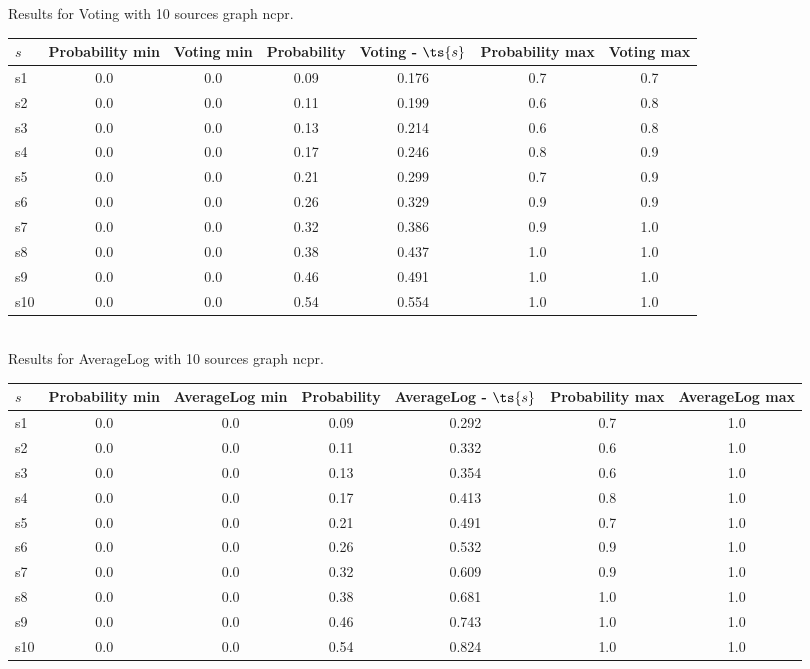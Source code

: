 \documentclass{article}
\begin{document}
\noindent Results for Voting with 10 sources graph ncpr.

\noindent\begin{tabular}{|l|c|c|c|c|c|c|}
\hline
$s$& Probability min & Voting min & Probability & Voting - $\ts{s}$ & Probability max & Voting max\\
\hline
s1 &0.0 & 0.0 & 0.09 & 0.176 & 0.7 & 0.7\\
\hline
s2 &0.0 & 0.0 & 0.11 & 0.199 & 0.6 & 0.8\\
\hline
s3 &0.0 & 0.0 & 0.13 & 0.214 & 0.6 & 0.8\\
\hline
s4 &0.0 & 0.0 & 0.17 & 0.246 & 0.8 & 0.9\\
\hline
s5 &0.0 & 0.0 & 0.21 & 0.299 & 0.7 & 0.9\\
\hline
s6 &0.0 & 0.0 & 0.26 & 0.329 & 0.9 & 0.9\\
\hline
s7 &0.0 & 0.0 & 0.32 & 0.386 & 0.9 & 1.0\\
\hline
s8 &0.0 & 0.0 & 0.38 & 0.437 & 1.0 & 1.0\\
\hline
s9 &0.0 & 0.0 & 0.46 & 0.491 & 1.0 & 1.0\\
\hline
s10 &0.0 & 0.0 & 0.54 & 0.554 & 1.0 & 1.0\\
\hline
\end{tabular}\\

\noindent Results for AverageLog with 10 sources graph ncpr.

\noindent\begin{tabular}{|l|c|c|c|c|c|c|}
\hline
$s$& Probability min & AverageLog min & Probability & AverageLog - $\ts{s}$ & Probability max & AverageLog max\\
\hline
s1 &0.0 & 0.0 & 0.09 & 0.292 & 0.7 & 1.0\\
\hline
s2 &0.0 & 0.0 & 0.11 & 0.332 & 0.6 & 1.0\\
\hline
s3 &0.0 & 0.0 & 0.13 & 0.354 & 0.6 & 1.0\\
\hline
s4 &0.0 & 0.0 & 0.17 & 0.413 & 0.8 & 1.0\\
\hline
s5 &0.0 & 0.0 & 0.21 & 0.491 & 0.7 & 1.0\\
\hline
s6 &0.0 & 0.0 & 0.26 & 0.532 & 0.9 & 1.0\\
\hline
s7 &0.0 & 0.0 & 0.32 & 0.609 & 0.9 & 1.0\\
\hline
s8 &0.0 & 0.0 & 0.38 & 0.681 & 1.0 & 1.0\\
\hline
s9 &0.0 & 0.0 & 0.46 & 0.743 & 1.0 & 1.0\\
\hline
s10 &0.0 & 0.0 & 0.54 & 0.824 & 1.0 & 1.0\\
\hline
\end{tabular}\\
\end{document}
